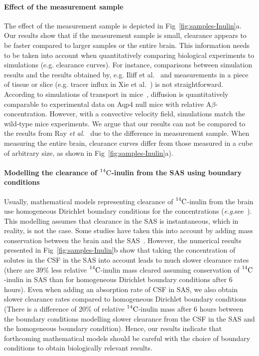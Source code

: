 \documentclass[a4paper,11pt]{article}
\newcommand{\eg}{\emph{e.g.}\;}
\newcommand{\etal}{\emph{et al.}\;}
\newcommand{\1}{^{(1)}}
\newcommand{\2}{^{(2)}}
\newcommand{\Cinulin}{$\prescript{14}{}{\text{C}}$-inulin }
\begin{document}
\paragraph{Effect of the measurement sample}
The effect of the measurement sample is depicted in Fig~\ref{fig:samples-Inulin}a. Our results show that if the measurement sample is small, clearance appears to be faster compared to larger samples or the entire brain. This information needs to be taken into account when quantitatively comparing biological experiments to simulations (e.g. clearance curves). For instance, comparisons between simulation results and the results obtained by, e.g. Iliff et al.~\cite{Iliff_2012_PVS} and measurements in a piece of tissue or slice (e.g. tracer influx in Xie et al.~\cite{Xie_2013_sleep}) is not straightforward. According to simulations of transport in mice~\cite{ray_analysis_2019}, diffusion is quantitatively comparable to experimental data on Aqp4 null mice with relative A$\beta$-concentration. However, with a convective velocity field, simulations match the wild-type mice experiments. We argue that our results can not be compared to the results from Ray \etal~\cite{ray_analysis_2019} due to the difference in measurement sample. When measuring the entire brain, clearance curves differ from those measured in a cube of arbitrary size, as shown in Fig~\ref{fig:samples-Inulin}a).

\paragraph{Modelling the clearance of \Cinulin from the SAS using boundary conditions}
Usually, mathematical models representing clearance of \Cinulin from the brain use homogeneous Dirichlet boundary conditions for the concentrations (\eg see~\cite{Holter9894,stoverud_modeling_2012}). This modelling assumes that clearance in the SAS is instantaneous, which in reality, is not the case. Some studies have taken this into account by adding mass conservation between the brain and the SAS~\cite{croci2019uncertainty}.
However, the numerical results presented in Fig~\ref{fig:samples-Inulin}b show that taking the concentration of solutes in the CSF in the SAS into account leads to much slower clearance rates (there are 39\% less relative \Cinulin mass cleared assuming conservation of \Cinulin in SAS than for homogeneous Dirichlet boundary conditions after 6 hours). Even when adding an absorption rate of CSF in SAS, we also obtain slower clearance rates compared to homogeneous Dirichlet boundary conditions (There is a difference of 20\% of relative \Cinulin mass after 6 hours between the boundary conditions modelling slower clearance from the CSF in the SAS and the homogeneous boundary condition). Hence, our results indicate that forthcoming mathematical models should be careful with the choice of boundary conditions to obtain biologically relevant results.
\end{document}
